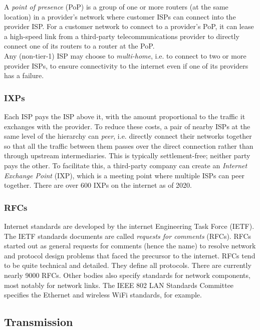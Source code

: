 \documentclass[8pt, table, xcdraw]{article}%
\begin{document}
A \emph{point of presence} (PoP) is a group of one or more routers (at the same location) in a provider’s network where customer ISPs can connect into the provider ISP. For a customer network to connect to a provider’s PoP, it can lease a high-speed link from a third-party telecommunications provider to directly connect one of its routers to a router at the PoP.\\
Any (non-tier-1) ISP may choose to \emph{multi-home}, i.e. to connect to two or more provider ISPs, to ensure connectivity to the internet even if one of its providers has a failure.

\subsubsection{IXPs} \label{IXPs}

Each ISP pays the ISP above it, with the amount proportional to the traffic it exchanges with the provider. To reduce these costs, a pair of nearby ISPs at the same level of the hierarchy can \emph{peer}, i.e. directly connect their networks together so that all the traffic between them passes over the direct connection rather than through upstream intermediaries. This is typically settlement-free; neither party pays the other. To facilitate this, a third-party company can create an \emph{Internet Exchange Point} (IXP), which is a meeting point where multiple ISPs can peer together. There are over 600 IXPs on the internet as of 2020.

\subsubsection{RFCs}

Internet standards are developed by the internet Engineering Task Force (IETF). The IETF standards documents are called \emph{requests for comments} (RFCs). RFCs started out as general requests for comments (hence the name) to resolve network and protocol design problems that faced the precursor to the internet. RFCs tend to be quite technical and detailed. They define all protocols. There are currently nearly 9000 RFCs. Other bodies also specify standards for network components, most notably for network links. The IEEE 802 LAN Standards Committee specifies the Ethernet and wireless WiFi standards, for example.

\subsection{Transmission}
\end{document}
